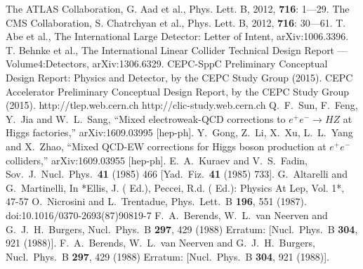 \documentclass[a4paper,10pt,twoside]{cpc-hepnp}
\begin{document}
\begin{thebibliography}{90}
\vspace{3mm}
The ATLAS Collaboration, G. Aad et al., Phys. Lett. B, 2012, {\bf 716}: 1---29.
The CMS Collaboration, S. Chatrchyan et al., Phys. Lett. B, 2012, {\bf 716}: 30---61.
T. Abe et al., The International Large Detector: Letter of Intent, arXiv:1006.3396.
T. Behnke et al., The International Linear Collider Technical Design Report --- Volume4:Detectors, arXiv:1306.6329.
CEPC-SppC Preliminary Conceptual Design Report: Physics and Detector, by the CEPC Study Group (2015).
CEPC Accelerator Preliminary Conceptual Design Report, by the CEPC Study Group (2015).
 http://tlep.web.cern.ch
 http://clic-study.web.cern.ch
  Q.~F.~Sun, F.~Feng, Y.~Jia and W.~L.~Sang,
  ``Mixed electroweak-QCD corrections to $e^+e^-\to HZ$ at Higgs factories,''
  arXiv:1609.03995 [hep-ph].
  Y.~Gong, Z.~Li, X.~Xu, L.~L.~Yang and X.~Zhao,
  ``Mixed QCD-EW corrections for Higgs boson production at $e^+e^-$ colliders,''
  arXiv:1609.03955 [hep-ph].
  E.~A.~Kuraev and V.~S.~Fadin,
  Sov.\ J.\ Nucl.\ Phys.\  {\bf 41} (1985) 466
   [Yad.\ Fiz.\  {\bf 41} (1985) 733].
  G.~Altarelli and G.~Martinelli,
  In *Ellis, J. ( Ed.), Peccei, R.d. ( Ed.): Physics At Lep, Vol. 1*, 47-57
  O.~Nicrosini and L.~Trentadue,
  Phys.\ Lett.\ B {\bf 196}, 551 (1987).
  doi:10.1016/0370-2693(87)90819-7
  F.~A.~Berends, W.~L.~van Neerven and G.~J.~H.~Burgers,
  Nucl.\ Phys.\ B {\bf 297}, 429 (1988)
  Erratum: [Nucl.\ Phys.\ B {\bf 304}, 921 (1988)].
  F.~A.~Berends, W.~L.~van Neerven and G.~J.~H.~Burgers,
  Nucl.\ Phys.\ B {\bf 297}, 429 (1988)
  Erratum: [Nucl.\ Phys.\ B {\bf 304}, 921 (1988)].


\end{thebibliography}

\clearpage
\end{document}
